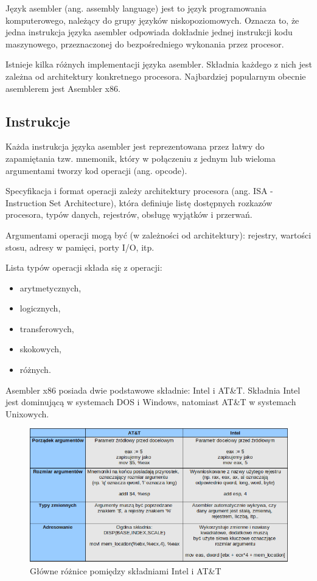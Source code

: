 \documentclass[a4paper,12pt]{article}
\begin{document}
Język asembler (ang. assembly language) jest to język programowania komputerowego, należący do grupy języków niskopoziomowych. Oznacza to, że jedna instrukcja języka asembler odpowiada dokładnie jednej instrukcji kodu maszynowego, przeznaczonej do bezpośredniego wykonania przez procesor.

Istnieje kilka różnych implementacji języka asembler. Składnia każdego z nich jest zależna od architektury konkretnego procesora. Najbardziej popularnym obecnie asemblerem jest Asembler x86.

\subsection{Instrukcje}

Każda instrukcja języka asembler jest reprezentowana przez łatwy do zapamiętania tzw. mnemonik, który w połączeniu z jednym lub wieloma argumentami tworzy kod operacji (ang. opcode).

Specyfikacja i format operacji zależy architektury procesora (ang. ISA - Instruction Set Architecture), która definiuje listę dostępnych rozkazów procesora, typów danych, rejestrów, obsługę wyjątków i przerwań.

Argumentami operacji mogą być (w zależności od architektury): rejestry, wartości stosu, adresy w pamięci, porty I/O, itp.

Lista typów operacji składa się z operacji:
\begin{itemize}
\item arytmetycznych,
\item logicznych,
\item transferowych,
\item skokowych,
\item różnych.
\end{itemize}

Asembler x86 posiada dwie podstawowe składnie: Intel i AT\&T. Składnia Intel jest dominującą w systemach DOS i Windows, natomiast AT\&T w systemach Unixowych\cite{asm_syn}.

\begin{figure}[h!]
\centering
\includegraphics[scale=0.6]{gfx/asm_syn_diff.png}
\caption{Główne różnice pomiędzy składniami Intel i AT\&T\cite{asm_syn}}
\end{figure}
\end{document}
